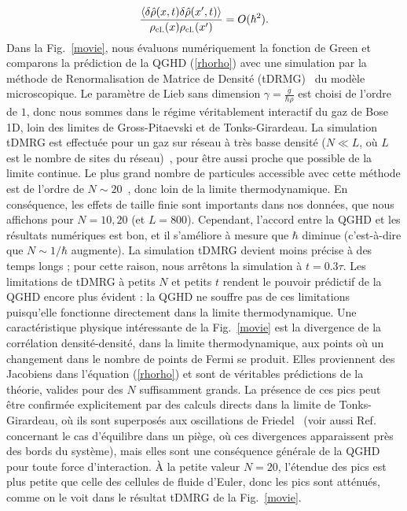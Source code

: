 \documentclass[twocolumn,amsfonts,showpacs,superscriptaddress]{revtex4-1}
\begin{document}
{\begin{eqnarray*}
	\frac{ \left< \delta \hat{\rho} (x,t) \delta \hat{\rho} (x',t) \right> }{\rho_{\rm cl.} (x) \rho_{\rm cl.} (x') 
} = O(\hbar^2) .
\end{eqnarray*}
Dans la Fig.~\ref{movie}, nous évaluons numériquement la fonction de Green et comparons la prédiction de la QGHD (\ref{rhorho}) avec une simulation par la méthode de Renormalisation de Matrice de Densité (tDRMG)~\cite{dmrg-rev, itensor} du modèle microscopique. Le paramètre de Lieb sans dimension $\gamma = \frac{\bar{g}}{\hbar \rho}$ est choisi de l'ordre de $1$, donc nous sommes dans le régime véritablement interactif du gaz de Bose 1D, loin des limites de Gross-Pitaevski et de Tonks-Girardeau. La simulation tDMRG est effectuée pour un gaz sur réseau à très basse densité ($N \ll L$, où $L$ est le nombre de sites du réseau)~\cite{schmidt2007exact,peotta2014quantum}, pour être aussi proche que possible de la limite continue. Le plus grand nombre de particules accessible avec cette méthode est de l'ordre de $N \sim 20$~\cite{peotta2014quantum}, donc loin de la limite thermodynamique. En conséquence, les effets de taille finie sont importants dans nos données, que nous affichons pour $N = 10, 20$ (et $L = 800$). Cependant, l'accord entre la QGHD et les résultats numériques est bon, et il s'améliore à mesure que $\hbar$ diminue (c'est-à-dire que $N\sim 1/\hbar$ augmente). La simulation tDMRG devient moins précise à des temps longs ; pour cette raison, nous arrêtons la simulation à $t= 0.3 \tau$. Les limitations de tDMRG à petits $N$ et petits $t$ rendent le pouvoir prédictif de la QGHD encore plus évident : la QGHD ne souffre pas de ces limitations puisqu'elle fonctionne directement dans la limite thermodynamique.
Une caractéristique physique intéressante de la Fig.~\ref{movie} est la divergence de la corrélation densité-densité, dans la limite thermodynamique, aux points où un changement dans le nombre de points de Fermi se produit. Elles proviennent des Jacobiens dans l'équation (\ref{rhorho}) et sont de véritables prédictions de la théorie, valides pour des $N$ suffisamment grands. La présence de ces pics peut être confirmée explicitement par des calculs directs dans la limite de Tonks-Girardeau, où ils sont superposés aux oscillations de Friedel~\cite{inpreparation} (voir aussi Ref.~\cite{brun2018inhomogeneous} concernant le cas d'équilibre dans un piège, où ces divergences apparaissent près des bords du système), mais elles sont une conséquence générale de la QGHD pour toute force d'interaction. À la petite valeur $N=20$, l'étendue des pics est plus petite que celle des cellules de fluide d'Euler, donc les pics sont atténués, comme on le voit dans le résultat tDMRG de la Fig.~\ref{movie}.\\
}
\end{document}
